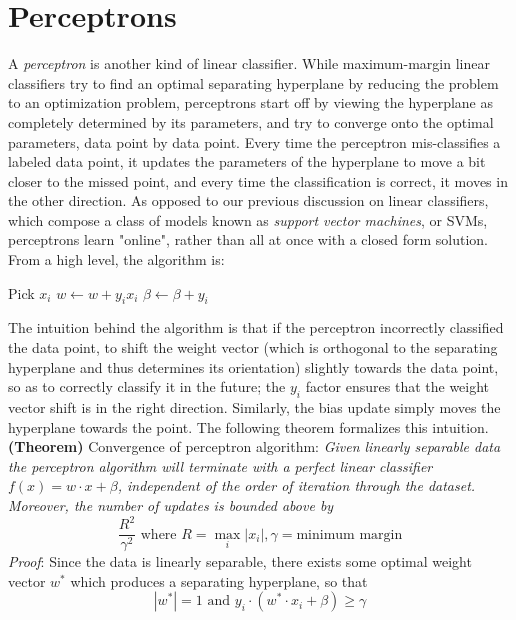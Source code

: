 \documentclass{article}
\begin{document}
\section{Perceptrons}
A \textit{perceptron} is another kind of linear classifier. While maximum-margin linear classifiers try to find an optimal separating hyperplane by reducing the problem to an optimization problem, perceptrons start off by viewing the hyperplane as completely determined by its parameters, and try to converge onto the optimal parameters, data point by data point. Every time the perceptron mis-classifies a labeled data point, it updates the parameters of the hyperplane to move a bit closer to the missed point, and every time the classification is correct, it moves in the other direction. As opposed to our previous discussion on linear classifiers, which compose a class of models known as \textit{support vector machines}, or SVMs, perceptrons learn "online", rather than all at once with a closed form solution. From a high level, the algorithm is:
\begin{algorithmic}
	\State Pick $ x_i $
		\State $ w \gets w + y_i x_i $
		\State $ \beta \gets \beta + y_i $
	\EndIf
\EndProcedure
\end{algorithmic}
The intuition behind the algorithm is that if the perceptron incorrectly classified the data point, to shift the weight vector (which is orthogonal to the separating hyperplane and thus determines its orientation) slightly towards the data point, so as to correctly classify it in the future; the $ y_i $ factor ensures that the weight vector shift is in the right direction. Similarly, the bias update simply moves the hyperplane towards the point. The following theorem formalizes this intuition.
\newline \newline
\textbf{(Theorem)} Convergence of perceptron algorithm: \textit{Given linearly separable data the perceptron algorithm will terminate with a perfect linear classifier $ f(x) = w \cdot x + \beta $, independent of the order of iteration through the dataset.}
\newline
\textit{Moreover, the number of updates is bounded above by}
$$ \frac{R^2}{\gamma^2} \text{ where } R = \max_{i} |x_i|, \gamma = \text{minimum margin} $$
\textit{Proof}: Since the data is linearly separable, there exists some optimal weight vector $ w^* $ which produces a separating hyperplane, so that 
$$ |w^*| = 1 \text{ and } y_i \cdot (w^* \cdot x_i + \beta) \geq \gamma $$
\end{document}
